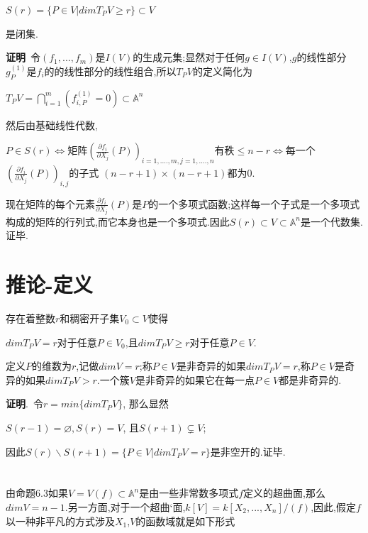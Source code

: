 \documentclass[UTF8]{book}
\begin{document}
\begin{center}
	$S(r) = \{P\in V|dim T_{P}V\geqslant r\} \subset V$
\end{center}


是闭集.


\textbf{证明}\
令$(f_{1},...,f_{m})$是$ I(V) $的生成元集;显然对于任何$g\in I(V)$,$ g $的线性部分$g_{P}^{(1)}$是$f_{i}$的的线性部分的线性组合,所以$T_{P}V$的定义简化为


\begin{center}
	$T_{P}V = \bigcap^{m}_{i=1}(f_{i,P}^{(1)}=0)\subset \mathbb{A}^{n}$
\end{center}


然后由基础线性代数,


\begin{center}
	$P\in S(r) \Longleftrightarrow$矩阵$(\frac{\partial f_{i}}{\partial X_{j}}(P))_{i=1,....,m,j=1,....,n}$有秩$\leqslant n-r \Longleftrightarrow$每一个$(\frac{\partial f_{i}}{\partial X_{j}}(P))_{i,j}$的子式 $(n-r+1)\times (n-r+1)$都为$ 0 $.
\end{center}


现在矩阵的每个元素$\frac{\partial f_{i}}{\partial X_{j}}(P)$是$ P $的一个多项式函数;这样每一个子式是一个多项式构成的矩阵的行列式,而它本身也是一个多项式.因此$S(r)\subset V\subset \mathbb{A}^{n}$是一个代数集.证毕.


\section{推论-定义}
存在着整数$ r $和稠密开子集$V_{0}\subset V$使得


\begin{center}
	$dim T_{P}V =r$对于任意$P\in V_{0}$,且$dim T_{P}V\geqslant r$对于任意$P\in V$.
\end{center}


定义$ P $的维数为$ r $,记做$dim V= r$;称$P\in V$是非奇异的如果$dim T_{P}V = r$,称$P\in V$是奇异的如果$dim T_{P}V > r$.一个簇$ V $是非奇异的如果它在每一点$P\in V$都是非奇异的.


\textbf{证明}.\ 令$r = min\{dim T_{P}V\}$, 那么显然


\begin{center}
	$S(r-1) = \varnothing,S(r) = V$, 且$S(r+1)\subsetneq V$;
\end{center}


因此$S(r)\backslash S(r+1)=\{P\in V|dim T_{P}V = r\}$是非空开的.证毕.


\section{ }
由命题6.3如果$V = V(f)\subset \mathbb{A}^{n}$是由一些非常数多项式$ f $定义的超曲面,那么$dim V = n-1$.另一方面,对于一个超曲`面,$k[V]=k[X_{2},...,X_{n}]/(f)$,因此,假定$ f $以一种非平凡的方式涉及$X_{1}$,$ V $的函数域就是如下形式
\end{document}
